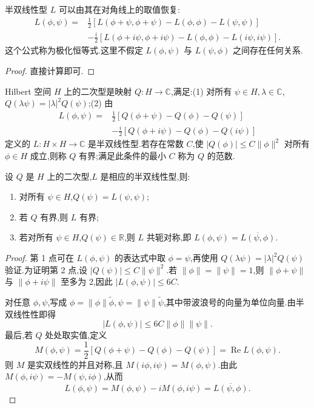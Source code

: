 \begin{proposition}[极化恒等式]\label{app:prop:polarization}
半双线性型 \(L\) 可以由其在对角线上的取值恢复:
\[
\begin{aligned}
L(\phi,\psi)={}&\frac12[L(\phi+\psi,\phi+\psi)-L(\phi,\phi)-L(\psi,\psi)]\\
&-\frac i2[L(\phi+i\psi,\phi+i\psi)-L(\phi,\phi)-L(i\psi,i\psi)].
\end{aligned}
\]
这个公式称为极化恒等式.这里不假定 \(L(\phi,\psi)\) 与 \(L(\psi,\phi)\) 之间存在任何关系.
\end{proposition}

\begin{proof}
直接计算即可.
\end{proof}

\begin{definition}[二次型]\label{app:def:quadratic-form}
Hilbert 空间 \(H\) 上的二次型是映射 \(Q:H\to\mathbb C\),满足:(1) 对所有 \(\psi\in H,\lambda\in\mathbb C\),\(Q(\lambda\psi)=|\lambda|^2Q(\psi)\);(2) 由
\[
\begin{aligned}
L(\phi,\psi)={}&\frac12[Q(\phi+\psi)-Q(\phi)-Q(\psi)]\\
&-\frac i2[Q(\phi+i\psi)-Q(\phi)-Q(i\psi)]
\end{aligned}
\]
定义的 \(L:H\times H\to\mathbb C\) 是半双线性型.若存在常数 \(C\),使 \(|Q(\phi)|\le C\|\phi\|^2\) 对所有 \(\phi\in H\) 成立,则称 \(Q\) 有界;满足此条件的最小 \(C\) 称为 \(Q\) 的范数.
\end{definition}

\begin{proposition}[二次型的性质]\label{app:prop:quadratic-properties}
设 \(Q\) 是 \(H\) 上的二次型,\(L\) 是相应的半双线性型,则:
\begin{enumerate}
  \item 对所有 \(\psi\in H\),\(Q(\psi)=L(\psi,\psi)\);
  \item 若 \(Q\) 有界,则 \(L\) 有界;
  \item 若对所有 \(\psi\in H\),\(Q(\psi)\in\mathbb R\),则 \(L\) 共轭对称,即 \(L(\phi,\psi)=\overline{L(\psi,\phi)}\).
\end{enumerate}
\end{proposition}

\begin{proof}
第 1 点可在 \(L(\phi,\psi)\) 的表达式中取 \(\phi=\psi\),再使用 \(Q(\lambda\psi)=|\lambda|^2Q(\psi)\) 验证.为证明第 2 点,设 \(|Q(\psi)|\le C\|\psi\|^2\).若 \(\|\phi\|=\|\psi\|=1\),则 \(\|\phi+\psi\|\) 与 \(\|\phi+i\psi\|\) 至多为 2,因此 \(|L(\phi,\psi)|\le6C\).

对任意 \(\phi,\psi\),写成 \(\phi=\|\phi\|\widetilde\phi,\psi=\|\psi\|\widetilde\psi\),其中带波浪号的向量为单位向量.由半双线性性即得
\[
|L(\phi,\psi)|\le6C\|\phi\|\|\psi\|.
\]
最后,若 \(Q\) 处处取实值,定义
\[
M(\phi,\psi)=\frac12[Q(\phi+\psi)-Q(\phi)-Q(\psi)]=\operatorname{Re}L(\phi,\psi).
\]
则 \(M\) 是实双线性的并且对称,且 \(M(i\phi,i\psi)=M(\phi,\psi)\).由此 \(M(\phi,i\psi)=-M(\psi,i\phi)\),从而
\[
L(\phi,\psi)=M(\phi,\psi)-iM(\phi,i\psi)
=\overline{L(\psi,\phi)}.
\]
\end{proof}

